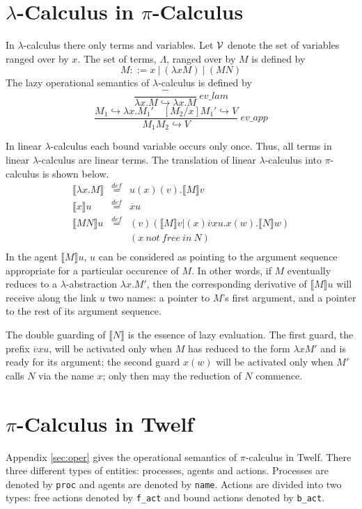 \documentclass[12pt]{article}
\begin{document}
\section{$\lambda$-Calculus in $\pi$-Calculus}
In $\lambda$-calculus there only terms and variables. Let $\cal V$ denote the set of variables ranged over by $x$. The set of terms, $\Lambda$, ranged over by $M$ is defined by \[ M ::= x \> | \> (\lambda x M) \> | \> (MN) \] The lazy operational semantics of $\lambda$-calculus is defined by 
\[ \frac{-}{{\lambda x.M} \hookrightarrow {\lambda x.M}} \> ev\_lam\]
	\[ \frac{M_1 \hookrightarrow \lambda x.M_1' \quad [M_2/x]M_1' \hookrightarrow V}{M_1M_2 \hookrightarrow V}\> ev\_app\]
	\par In linear $\lambda$-calculus each bound variable occurs only once. Thus, all terms in linear $\lambda$-calculus are linear terms. The translation of linear $\lambda$-calculus into $\pi$-calculus is shown below.
	\begin{eqnarray*}
	\llbracket \lambda x.M \rrbracket & \stackrel{def}{=} & u(x)(v).\llbracket M \rrbracket v \\
	\llbracket x \rrbracket u & \stackrel{def}{=} & \overline{x}u \\
	\llbracket M N \rrbracket u & \stackrel{def}{=} & (v)(\llbracket M \rrbracket v | (x) \overline{v}xu.x(w). \llbracket N \rrbracket w) \\
	& & (x \> not \> free \> in \> N) \\
	\end{eqnarray*}
	In the agent $\llbracket M \rrbracket u$, $u$ can be considered as pointing to the argument sequence appropriate for a particular occurence of $M$. In other words, if $M$ eventually reduces to a $\lambda$-abstraction $\lambda x.M'$, then the corresponding derivative of $\llbracket M \rrbracket u$ will receive along the link $u$ two names: a pointer to $M$'s first argument, and a pointer to the rest of its argument sequence.
	\par The double guarding of $\llbracket N \rrbracket$ is the essence of lazy evaluation. The first guard, the prefix $\overline{v}xu$, will be activated only when $M$ has reduced to the form $\lambda xM'$ and is ready for its argument; the second guard $x(w)$ will be activated only when $M'$ calls $N$ via the name $x$; only then may the reduction of $N$ commence.
\section{$\pi$-Calculus in Twelf}
Appendix \ref{sec:oper} gives the operational semantics of $\pi$-calculus in Twelf. There three different types of entities: processes, agents and actions. Processes are denoted by {\tt proc} and agents are denoted by {\tt name}. Actions are divided into two types: free actions denoted by {\tt f\_act} and bound actions denoted by {\tt b\_act}.
\end{document}
